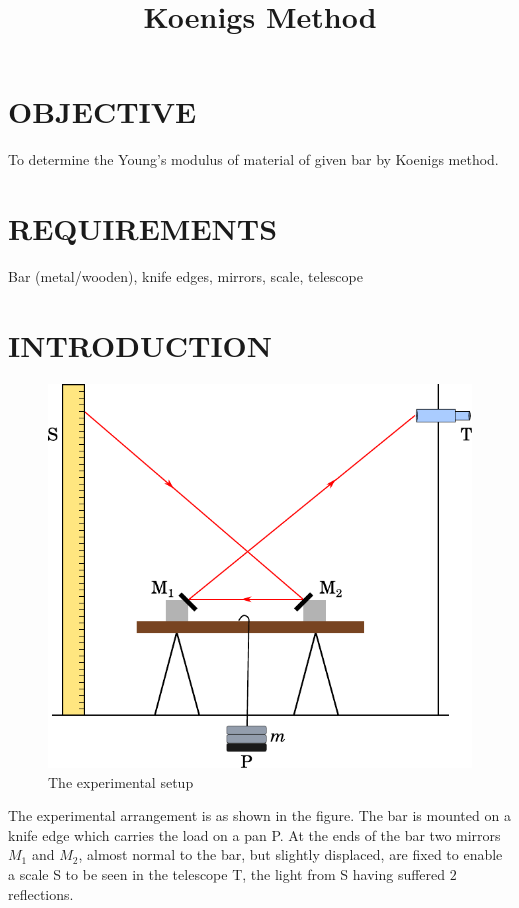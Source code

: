 \documentclass[12pt,a4paper]{article}
\title{Koenigs Method}
\begin{document}
	\maketitle
	\section{OBJECTIVE}
		To determine the Young's modulus of material of given bar by Koenigs method.
		
	\section{REQUIREMENTS}
		Bar (metal/wooden), knife edges, mirrors, scale, telescope
	
	\section{INTRODUCTION}
		\begin{figure}[!htb]
			\centering
			\includegraphics[scale=0.7]{koenig-setup.pdf}
			\caption{The experimental setup}
		\end{figure}
		The experimental arrangement is as shown in the figure. The bar is mounted on a knife edge which carries the load on a pan P. At the ends of the bar two mirrors $M_1$ and $M_2$, almost normal to the bar, but slightly displaced, are fixed to enable a scale S to be seen in the telescope T, the light from S having suffered $2$ reflections. 
		
\end{document}
